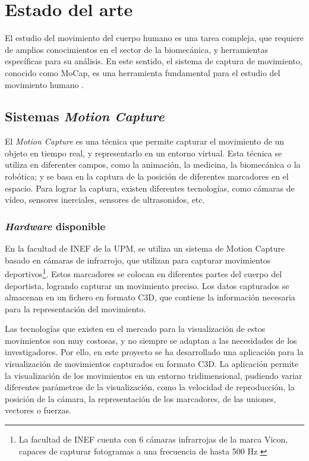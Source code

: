 \chapter{Estado del arte} \label{sec:cap2}

\noindent El estudio del movimiento del cuerpo humano es una tarea compleja, que requiere de amplios conocimientos en el sector de la biomecánica, y herramientas específicas para su análisis. En este sentido, el sistema de captura de movimiento, conocido como \ac{MoCap}, es una herramienta fundamental para el estudio del movimiento humano \autocite{taiQueEsMotion2024}.


\section{Sistemas \textit{Motion Capture}}
El \textit{Motion Capture} es una técnica que permite capturar el movimiento de un objeto en tiempo real, y representarlo en un entorno virtual. Esta técnica se utiliza en diferentes campos, como la animación, la medicina, la biomecánica o la robótica; y se basa en la captura de la posición de diferentes marcadores en el espacio. Para lograr la captura, existen diferentes tecnologías, como cámaras de vídeo, sensores inerciales, sensores de ultrasonidos, etc. \autocite{taiQueEsMotion2024}

\subsection{\textit{Hardware} disponible}
En la facultad de \ac{INEF} de la \ac{UPM}, se utiliza un sistema de Motion Capture basado en cámaras de infrarrojo, que utilizan para capturar movimientos deportivos\footnote{La facultad de INEF cuenta con 6 cámaras infrarrojas de la marca Vicon, capaces de capturar fotogramas a una frecuencia de hasta 500 \ac{Hz} \autocite{FacultadCienciasActividad}}. Estos marcadores se colocan en diferentes partes del cuerpo del deportista, logrando capturar un movimiento preciso. Los datos capturados se almacenan en un fichero en formato \ac{C3D}, que contiene la información necesaria para la representación del movimiento. 

Las tecnologías que existen en el mercado para la visualización de estos movimientos son muy costosas, y no siempre se adaptan a las necesidades de los investigadores. Por ello, en este proyecto se ha desarrollado una aplicación para la visualización de movimientos capturados en formato \ac{C3D}. La aplicación permite la visualización de los movimientos en un entorno tridimensional, pudiendo variar diferentes parámetros de la visualización, como la velocidad de reproducción, la posición de la cámara, la representación de los marcadores, de las uniones, vectores o fuerzas.

